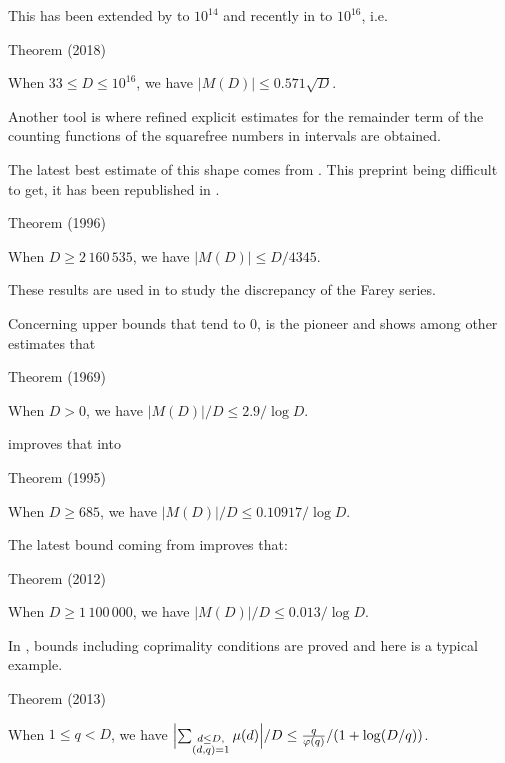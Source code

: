 This has been extended by
\cite{Kotnik-VanDeLune*04}
to $10^{14}$ and recently in
\cite{Hurst*18}
to $10^{16}$, i.e.

\begin{thm}{Theorem (2018)}

When $33\le D\le 10^{16}$, we have $|M(D)|\le 0.571\sqrt{D}$.
\end{thm}



Another tool is 
\cite{Cohen-Dress*88}
where refined explicit estimates for the remainder term of the counting
functions of the squarefree numbers in intervals are obtained.

\par 
The latest best estimate of this shape comes from
\cite{Cohen-Dress-ElMarraki*96}.
This preprint being difficult to get, it has been republished in
\cite{Cohen-Dress-ElMarraki*07}.
\begin{thm}{Theorem (1996)}

When $D\ge 2\,160\,535$, we have $|M(D)|\le D/4345$.
\end{thm}

These results are used in
\cite{Dress*99}
to study the discrepancy of the Farey series.

\par \par 
Concerning upper bounds that tend to $0$, 
\cite{Schoenfeld*69} is the pioneer
and shows among other estimates that 
\begin{thm}{Theorem (1969)}

When $D>0$, we have $|M(D)|/D\le 2.9/\log D$.
\end{thm}

\cite{ElMarraki*95} improves that
into
\begin{thm}{Theorem (1995)}

When $D\ge 685$, we have $|M(D)|/D\le 0.10917/\log D$.
\end{thm}

The latest bound coming from
\cite{Ramare*12-2} improves that:
\begin{thm}{Theorem (2012)}

When $D\ge 1\,100\,000$, we have $|M(D)|/D\le 0.013/\log D$.
\end{thm}


In
\cite{Ramare*12-5},
bounds including coprimality conditions are proved and here is a
typical example.
\begin{thm}{Theorem (2013)}

  When $1\le q < D$, we have
                $\Bigl|\sum_{\substack{ d\le D, \\
                (d,q)=1}}\mu(d)\Bigr|/D\le
                \frac{q}{\varphi(q)}/(1+\log (D/q))$.
\end{thm}








